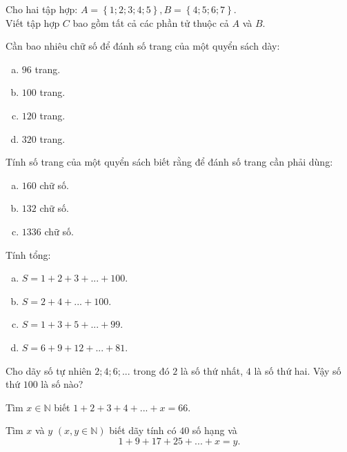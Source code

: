 \begin{bt}
Cho hai tập hợp: $A = \left\{1; 2; 3; 4; 5\right\}, B = \left\{4; 5; 6; 7\right\}$.\\
Viết tập hợp $C$ bao gồm tất cả các phần tử thuộc cả $A$ và $B$.
\newpage
\end{bt}   \begin{bt}
Cần bao nhiêu chữ số để đánh số trang của một quyển sách dày:
\begin{enumerate}[a)]
\item	$96$ trang.
\item	$100$ trang.
\item	$120$ trang.
\item	$320$ trang.
\end{enumerate}
\end{bt}   \begin{bt}
Tính số trang của một quyển sách biết rằng để đánh số trang cần phải dùng:
\begin{enumerate}[a)]
\item	$160$ chữ số.
\item	$132$ chữ số.
\item	$1336$ chữ số.
\end{enumerate}
\end{bt}   \begin{bt}
Tính tổng:
\begin{enumerate}[a)]
\item $S= 1 + 2 + 3 + ... + 100$.
\item $S= 2 + 4 + ... + 100$.
\item $S= 1 + 3 + 5 + ...+ 99$.
\item $S= 6 + 9 + 12 + ... + 81$.
\end{enumerate}
\end{bt}   \begin{bt}
Cho dãy số tự nhiên $2; 4; 6;...$ trong đó $2$ là số thứ nhất, $4$ là số thứ hai. Vậy số thứ $100$ là số nào?
\end{bt}   \begin{bt}
Tìm $x \in \mathbb{N}$ biết $1 + 2 + 3 + 4 +...+ x = 66$.
\end{bt}   \begin{bt}
Tìm $x$ và $y$ $(x, y \in \mathbb{N})$ biết dãy tính có $40$ số hạng và $$1 + 9 + 17 + 25 + ...+ x = y.$$
\end{bt}   